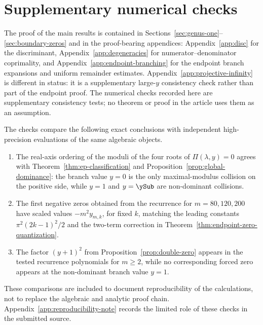 \section{Supplementary numerical checks}\label{sec:verification}

The proof of the main results is contained in Sections~\ref{sec:genus-one}--\ref{sec:boundary-zeros} and in the proof-bearing appendices: Appendix~\ref{app:disc} for the discriminant, Appendix~\ref{app:degeneracies} for numerator--denominator coprimality, and Appendix~\ref{app:endpoint-branching} for the endpoint branch expansions and uniform remainder estimates.
Appendix~\ref{app:projective-infinity} is different in status: it is a supplementary large-\(y\) consistency check rather than part of the endpoint proof.
The numerical checks recorded here are supplementary consistency tests; no theorem or proof in the article uses them as an assumption.

The checks compare the following exact conclusions with independent high-precision evaluations of the same algebraic objects.
\begin{enumerate}
\item The real-axis ordering of the moduli of the four roots of \(\Pi(\lambda,y)=0\) agrees with Theorem~\ref{thm:ep-classification} and Proposition~\ref{prop:global-dominance}: the branch value \(y=0\) is the only maximal-modulus collision on the positive side, while \(y=1\) and \(y=\ySub\) are non-dominant collisions.
\item The first negative zeros obtained from the recurrence for \(m=80,120,200\) have scaled values \(-m^2y_{m,k}\), for fixed \(k\), matching the leading constants \(\pi^2(2k-1)^2/2\) and the two-term correction in Theorem~\ref{thm:endpoint-zero-quantization}.
\item The factor \((y+1)^2\) from Proposition~\ref{prop:double-zero} appears in the tested recurrence polynomials for \(m\ge2\), while no corresponding forced zero appears at the non-dominant branch value \(y=1\).
\end{enumerate}

These comparisons are included to document reproducibility of the calculations, not to replace the algebraic and analytic proof chain.
Appendix~\ref{app:reproducibility-note} records the limited role of these checks in the submitted source.
